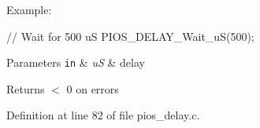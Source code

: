 \-Example\-:\par
 
\begin{DoxyCode}
   // Wait for 500 uS
   PIOS_DELAY_Wait_uS(500);
\end{DoxyCode}
 
\begin{DoxyParams}[1]{\-Parameters}
\mbox{\tt in}  & {\em u\-S} & delay \\
\hline
\end{DoxyParams}
\begin{DoxyReturn}{\-Returns}
$<$ 0 on errors 
\end{DoxyReturn}


\-Definition at line 82 of file pios\-\_\-delay.\-c.

